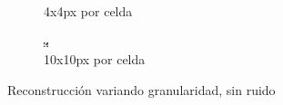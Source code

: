 \documentclass[11pt]{beamer}
\begin{document}
\begin{frame}
\begin{figure}[H]
\begin{subfigure}[h]{0.30\textwidth}
            \caption{4x4px por celda}
            \label{fig:reconstruccion 10 px}
        \end{subfigure}%
    \hfill
        \begin{subfigure}[h]{0.30\textwidth} 
            \includegraphics[width=\textwidth]{img/tomo_granu_20.png}
            \caption{10x10px por celda}
            \label{fig:reconstruccion 20 px}
        \end{subfigure}
        
        \caption{Reconstrucción variando granularidad, sin ruido}
    \end{figure}
\end{frame}
    
\end{document}
